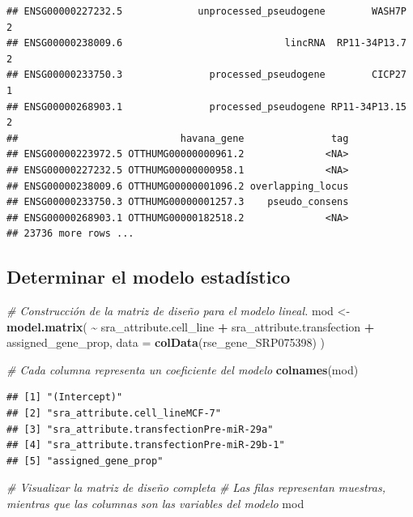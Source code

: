 \documentclass[
]{article}
\newenvironment{Shaded}{\begin{snugshade}}{\end{snugshade}}
\newcommand{\AttributeTok}[1]{\textcolor[rgb]{0.13,0.29,0.53}{#1}}
\newcommand{\CommentTok}[1]{\textcolor[rgb]{0.56,0.35,0.01}{\textit{#1}}}
\newcommand{\FunctionTok}[1]{\textcolor[rgb]{0.13,0.29,0.53}{\textbf{#1}}}
\newcommand{\NormalTok}[1]{#1}
\newcommand{\OtherTok}[1]{\textcolor[rgb]{0.56,0.35,0.01}{#1}}
\newcommand{\SpecialCharTok}[1]{\textcolor[rgb]{0.81,0.36,0.00}{\textbf{#1}}}
\begin{document}
\begin{verbatim}
## ENSG00000227232.5             unprocessed_pseudogene        WASH7P     2
## ENSG00000238009.6                            lincRNA  RP11-34P13.7     2
## ENSG00000233750.3               processed_pseudogene        CICP27     1
## ENSG00000268903.1               processed_pseudogene RP11-34P13.15     2
##                            havana_gene               tag
## ENSG00000223972.5 OTTHUMG00000000961.2              <NA>
## ENSG00000227232.5 OTTHUMG00000000958.1              <NA>
## ENSG00000238009.6 OTTHUMG00000001096.2 overlapping_locus
## ENSG00000233750.3 OTTHUMG00000001257.3    pseudo_consens
## ENSG00000268903.1 OTTHUMG00000182518.2              <NA>
## 23736 more rows ...
\end{verbatim}

\subsection{Determinar el modelo
estadístico}\label{determinar-el-modelo-estaduxedstico}

\begin{Shaded}
\begin{Highlighting}[]
\CommentTok{\# Construcción de la matriz de diseño para el modelo lineal.}
\NormalTok{mod }\OtherTok{\textless{}{-}} \FunctionTok{model.matrix}\NormalTok{(}
  \SpecialCharTok{\textasciitilde{}}\NormalTok{ sra\_attribute.cell\_line }\SpecialCharTok{+}\NormalTok{ sra\_attribute.transfection }\SpecialCharTok{+}\NormalTok{ assigned\_gene\_prop,}
  \AttributeTok{data =} \FunctionTok{colData}\NormalTok{(rse\_gene\_SRP075398)}
\NormalTok{)}

\CommentTok{\# Cada columna representa un coeficiente del modelo}
\FunctionTok{colnames}\NormalTok{(mod)}
\end{Highlighting}
\end{Shaded}

\begin{verbatim}
## [1] "(Intercept)"                            
## [2] "sra_attribute.cell_lineMCF-7"           
## [3] "sra_attribute.transfectionPre-miR-29a"  
## [4] "sra_attribute.transfectionPre-miR-29b-1"
## [5] "assigned_gene_prop"
\end{verbatim}

\begin{Shaded}
\begin{Highlighting}[]
\CommentTok{\# Visualizar la matriz de diseño completa}
\CommentTok{\# Las filas representan muestras, mientras que las columnas son las variables del modelo}
\NormalTok{mod}
\end{Highlighting}
\end{Shaded}
\end{document}
